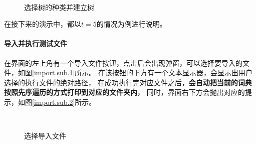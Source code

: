 \documentclass{article}
\begin{document}
\begin{figure}[H]
    \centering
    \,    
	\,
	\caption{选择树的种类并建立树}
	\label{tree.main}
\end{figure}

在接下来的演示中，都以$t=5$的情况为例进行说明。

\paragraph{导入并执行测试文件}在界面的左上角有一个导入文件按钮，点击后会出现弹窗，可以选择要导入的文件，如图\ref{import.sub.1}所示。
在该按钮的下方有一个文本显示器，会显示出用户选择的执行文件的绝对路径，
在成功执行完对应文件之后，\textbf{会自动把当前的词典按照先序遍历的方式打印到对应的文件夹内}， 
同时，界面右下方会抛出对应的提示，如图\ref{import.sub.2}所示。

\begin{figure}[H]
    \centering
    \,    
	\caption{选择导入文件}\label{import.main}
	
\end{figure}
\end{document}
